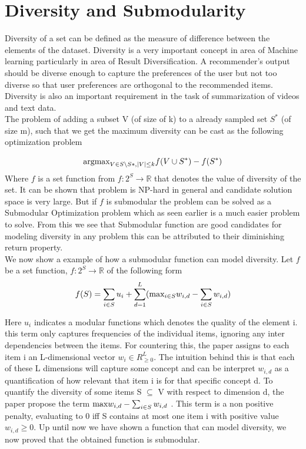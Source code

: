 \documentclass[a4paper,twoside]{iiththesis}
\theoremstyle{definition}
\theoremstyle{definition}
\theoremstyle{remark}
\begin{document}
\section{Diversity and Submodularity}

Diversity of a set can be defined as the measure of difference between the elements of the dataset.  Diversity is a very important concept in area of Machine learning particularly in area of Result Diversification. A recommender's output should be diverse enough to capture the preferences of the user but not too diverse so that user preferences are orthogonal to the recommended items. Diversity is also an important requirement in the task of summarization of videos and text data. \\
The problem of adding a subset V (of size of k) to a already sampled set $S^*$ (of size m), such that we get the maximum diversity can be cast as the following optimization problem

\begin{equation}\label{diversitynphard}
\text{argmax}_{V \in S\setminus S*, |V|\leq k}\space f(V\cup S^*) - f(S^*)
\end{equation}
Where $f$ is a set function from $f:2^S \rightarrow \mathbb{R}$ that denotes the value of diversity of the set. It can be shown that problem is NP-hard in general and candidate solution space is very large. But if $f$ is submodular the problem can be solved as a Submodular Optimization problem which as seen earlier is a much easier problem to solve. From this we see that Submodular function are good candidates for modeling diversity in any problem this can be attributed to their diminishing return property.\\

We now show a example\cite{tschiatschek2016learning} of how a submodular function can model diversity. 
Let $f$ be a set function, $f : 2^S \rightarrow \mathbb{R}$ of the following form 
\begin{equation}\label{Diversity2}
	f(S) = \sum_{i\in S} u_i + \sum_{d=1}^L (\text{max}_{i\in S} \space w_{i, d} - \sum_{i \in S} w_{i, d} )
\end{equation}

Here $u_i$ indicates a modular functions which denotes the quality of the element i.
this term only captures frequencies of the individual items, ignoring any inter dependencies between the items. For countering this, the paper assigns to each item i an L-dimensional vector $w_i \in R^L_{ \geq 0} $. The intuition behind this is that each of these L dimensions will capture
some concept and can be interpret $w_{i,d}$ as a quantification of how relevant that
item i is for that specific concept d. To quantify the diversity of some items S $\subseteq$ V with respect to dimension d, the paper propose the term $\text{max}\space w_{i, d} - \sum_{i \in S} w_{i, d}$ . This
term is a non positive penalty, evaluating to 0 iff S contains at most one item i with positive value $w_{i,d} \geq 0$. Up until now we have shown a function that can model diversity, we now proved that the obtained function is submodular.  \\
\end{document}
